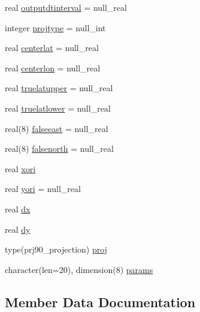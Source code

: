 \begin{DoxyCompactItemize}
\item 
real \mbox{\hyperlink{structmodulecalmetformat_1_1t__calmetformat_ad3a3ed65072001c75e8c54a87ff34f8c}{outputdtinterval}} = null\+\_\+real
\item 
integer \mbox{\hyperlink{structmodulecalmetformat_1_1t__calmetformat_a8964c4f3bed0a0f19c896be56d144923}{projtype}} = null\+\_\+int
\item 
real \mbox{\hyperlink{structmodulecalmetformat_1_1t__calmetformat_ae713bee4ccca410a2c0307e04ff655d8}{centerlat}} = null\+\_\+real
\item 
real \mbox{\hyperlink{structmodulecalmetformat_1_1t__calmetformat_af13f0c55621696f6417086a1f529a7bb}{centerlon}} = null\+\_\+real
\item 
real \mbox{\hyperlink{structmodulecalmetformat_1_1t__calmetformat_a4409efd81c8df31fdd9ce8098fbae418}{truelatupper}} = null\+\_\+real
\item 
real \mbox{\hyperlink{structmodulecalmetformat_1_1t__calmetformat_a5847f93371ebcca776da48f8f1174532}{truelatlower}} = null\+\_\+real
\item 
real(8) \mbox{\hyperlink{structmodulecalmetformat_1_1t__calmetformat_aa36edcd378464bb6c2955dd3e5416e25}{falseeast}} = null\+\_\+real
\item 
real(8) \mbox{\hyperlink{structmodulecalmetformat_1_1t__calmetformat_a5cb197aaba8c9e815f01ec514fa345f6}{falsenorth}} = null\+\_\+real
\item 
real \mbox{\hyperlink{structmodulecalmetformat_1_1t__calmetformat_a4720c734874a428ac2575d41f85a85d6}{xori}}
\item 
real \mbox{\hyperlink{structmodulecalmetformat_1_1t__calmetformat_a11588b908139fe66f96282773a1bfd09}{yori}} = null\+\_\+real
\item 
real \mbox{\hyperlink{structmodulecalmetformat_1_1t__calmetformat_a32cb4a5278b3b4613826caacc1f53330}{dx}}
\item 
real \mbox{\hyperlink{structmodulecalmetformat_1_1t__calmetformat_a024d91785a3947e38623989358b706b8}{dy}}
\item 
type(prj90\+\_\+projection) \mbox{\hyperlink{structmodulecalmetformat_1_1t__calmetformat_ae446dba999127299102ced25afc62a5d}{proj}}
\item 
character(len=20), dimension(8) \mbox{\hyperlink{structmodulecalmetformat_1_1t__calmetformat_a20ec9ed688720f413717305bfd0c9e81}{params}}
\end{DoxyCompactItemize}


\subsection{Member Data Documentation}
\mbox{\label{structmodulecalmetformat_1_1t__calmetformat_a048a1dbd642743581275c4e2637b509e}} 
